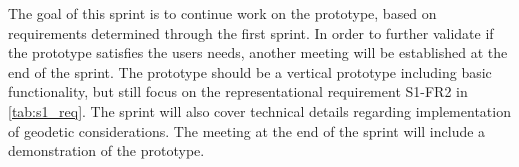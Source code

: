 The goal of this sprint is to continue work on the prototype, based on requirements determined through the first sprint. In order to further validate if the prototype satisfies the users needs, another meeting will be established at the end of the sprint. The prototype should be a vertical prototype including basic functionality, but still focus on the representational requirement S1-FR2 in \cref{tab:s1_req}. The sprint will also cover technical details regarding implementation of geodetic considerations. The meeting at the end of the sprint will include a demonstration of the prototype.